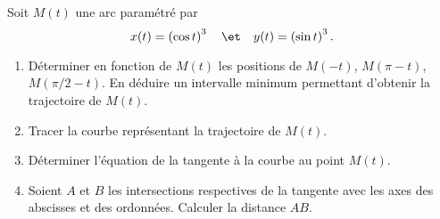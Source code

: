 \begin{enonce}
\begin{exercise}[ID={RMS126 E894},subtitle={ENSAM PSI 2015},tags={}, difficulty={0}]
Soit $M(t)$ une arc paramétré par
\begin{equation*}
  x(t)=\left( \cos t \right)^3 \quad\et\quad y(t)=\left( \sin t \right)^3.
\end{equation*}
\begin{enumerate}
  \item Déterminer en fonction de $M(t)$ les positions de $M(-t)$, $M(\pi-t)$, $M(\pi/2 - t)$.
    En déduire un intervalle minimum permettant d'obtenir la trajectoire de $M(t)$.

  \item Tracer la courbe représentant la trajectoire de $M(t)$.

  \item Déterminer l'équation de la tangente à la courbe au point $M(t)$.

  \item Soient $A$ et $B$ les intersections respectives de la tangente avec les axes des abscisses et des ordonnées.
    Calculer la distance $AB$.
\end{enumerate}
\end{exercise}
\begin{solution}
\end{solution}
\end{enonce}
